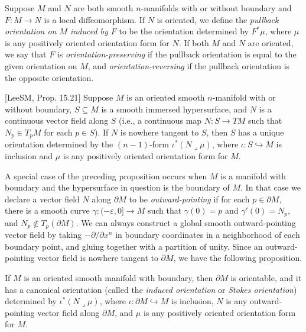 Suppose $M$ and $N$ are both smooth $n$-manifolds with or without boundary and $F : M \to N$ is a local diffeomorphism. If $N$ is oriented, we define the \textit{pullback orientation on $M$ induced by $F$} to be the orientation determined by $F^* \mu$, where $\mu$ is any positively oriented orientation form for $N$. If both $M$ and $N$ are oriented, we say that $F$ is \textit{orientation-preserving} if the pullback orientation is equal to the given orientation on $M$, and \textit{orientation-reversing} if the pullback orientation is the opposite orientation.

\begin{proposition}
\label{prop:orientation-of-hypersurface}
[LeeSM, Prop. 15.21]
Suppose $M$ is an oriented smooth $n$-manifold with or without boundary, $S \subseteq M$ is a smooth immersed hypersurface, and $N$ is a continuous vector field along $S$ (i.e., a continuous map $N : S \to TM$ such that $N_p \in T_p M$ for each $p \in S$). If $N$ is nowhere tangent to $S$, then $S$ has a unique orientation determined by the $(n-1)$-form $\iota^*(N \lrcorner \mu)$, where $\iota : S \hookrightarrow M$ is inclusion and $\mu$ is any positively oriented orientation form for $M$.
\end{proposition}

A special case of the preceding proposition occurs when $M$ is a manifold with boundary and the hypersurface in question is the boundary of $M$. In that case we declare a vector field $N$ along $\partial M$ to be \textit{outward-pointing} if for each $p \in \partial M$, there is a smooth curve $\gamma : (-\varepsilon, 0] \to M$ such that $\gamma(0) = p$ and $\gamma'(0) = N_p$, and $N_p \notin T_p(\partial M)$. We can always construct a global smooth outward-pointing vector field by taking $-\partial/\partial x^n$ in boundary coordinates in a neighborhood of each boundary point, and gluing together with a partition of unity. Since an outward-pointing vector field is nowhere tangent to $\partial M$, we have the following proposition.

\begin{proposition}
\label{prop:induced-orientation-boundary}
If $M$ is an oriented smooth manifold with boundary, then $\partial M$ is orientable, and it has a canonical orientation (called the \emph{induced orientation} or \emph{Stokes orientation}) determined by $\iota^*(N \lrcorner \mu)$, where $\iota: \partial M \hookrightarrow M$ is inclusion, $N$ is any outward-pointing vector field along $\partial M$, and $\mu$ is any positively oriented orientation form for $M$.
\end{proposition}


